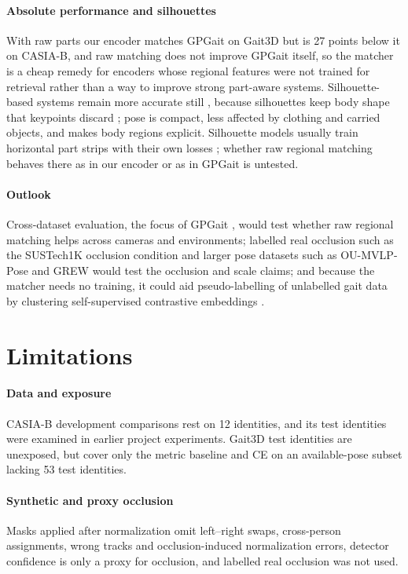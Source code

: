 \documentclass[journal]{IEEEtran}
\begin{document}
\paragraph{Absolute performance and silhouettes}
With raw parts our encoder matches GPGait on Gait3D but is 27 points below it
on CASIA-B, and raw matching does not improve GPGait itself, so the matcher is a
cheap remedy for encoders whose regional features were not trained for
retrieval rather than a way to improve strong part-aware systems.
Silhouette-based systems remain more accurate still
\cite{chao2019gaitset,fan2020gaitpart,lin2021gaitgl,fan2022opengait}, because
silhouettes keep body shape that keypoints discard \cite{fu2023gpgait}; pose is
compact, less affected by clothing and carried objects, and makes body regions
explicit. Silhouette models usually train horizontal part strips with their own
losses \cite{chao2019gaitset,fan2020gaitpart}; whether raw regional matching
behaves there as in our encoder or as in GPGait is untested.

\paragraph{Outlook}
Cross-dataset evaluation, the focus of GPGait \cite{fu2023gpgait}, would test
whether raw regional matching helps across cameras and environments; labelled
real occlusion such as the SUSTech1K occlusion condition \cite{shen2023lidargait}
and larger pose datasets such as OU-MVLP-Pose and GREW
\cite{an2020oumvlppose,zhu2021grew} would test the occlusion and scale claims;
and because the matcher needs no training, it could aid pseudo-labelling of
unlabelled gait data by clustering self-supervised contrastive embeddings
\cite{cosma2026gaitpt}.

\section{Limitations}
\label{sec:limitations}

\paragraph{Data and exposure}
CASIA-B development comparisons rest on 12 identities, and its test identities
were examined in earlier project experiments. Gait3D test identities are
unexposed, but cover only the metric baseline and CE on an available-pose
subset lacking 53 test identities.

\paragraph{Synthetic and proxy occlusion}
Masks applied after normalization omit left--right swaps, cross-person
assignments, wrong tracks and occlusion-induced normalization errors, detector
confidence is only a proxy for occlusion, and labelled real occlusion was not
used.
\end{document}
